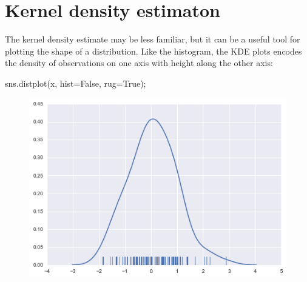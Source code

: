 \section{Kernel density estimaton}
\begin{frame}[fragile]
	
The kernel density estimate may be less familiar, but it can be a useful tool for plotting the shape of a distribution. Like the histogram, the KDE plots encodes the density of observations on one axis with height along the other axis:

sns.distplot(x, hist=False, rug=True);
\begin{figure}
	\centering
	\includegraphics[width=0.7\linewidth]{images/distributions_14_0}
\end{figure}
\end{frame}
